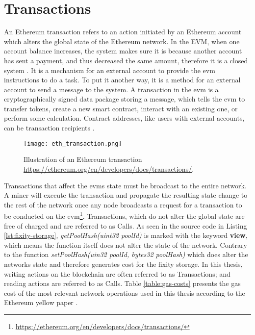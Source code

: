 \section{Transactions}\label{sec:tx-cost}
An Ethereum transaction refers to an action initiated by an Ethereum account which alters the global state of the Ethereum network. In the EVM, when one account balance increases, the system makes sure it is because another account has sent a payment, and thus decreased the same amount, therefore it is a closed system \cite[25]{dannen2017introducing}.
It is a mechanism for an external account to provide the \acrshort{evm} instructions to do a task. To put it another way, it is a method for an external account to send a message to the system. A transaction in the \acrshort{evm} is a cryptographically signed data package storing a message, which tells the \acrshort{evm} to transfer tokens, create a new smart contract, interact with an existing one, or perform some calculation. Contract addresses, like users with external accounts, can be transaction recipients \cite[60]{dannen2017introducing}. 
\begin{figure}[t]
    \centering
    \texttt{[image: eth\_transaction.png]}
    \caption{Illustration of an Ethereum transaction \url{https://ethereum.org/en/developers/docs/transactions/}.}
\end{figure}
Transactions that affect the \acrshort{evm}s state must be broadcast to the entire network. A miner will execute the transaction and propagate the resulting state change to the rest of the network once any node broadcasts a request for a transaction to be conducted on the \acrshort{evm}\footnote{\url{https://ethereum.org/en/developers/docs/transactions/}}.
Transactions, which do not alter the global state are free of charged and are referred to as Calls. As seen in the source code in Listing \ref{lst:fixity-storage}, \textit{getPoolHash(uint32 poolId)} is marked with the keyword \textbf{view}, which means the function itself does not alter the state of the network. Contrary to the function \textit{setPoolHash(uin32 poolId, bytes32 poolHash)} which does alter the networks state and therefore generates cost for the fixity storage. In this thesis, writing actions on the blockchain are often referred to as Transactions; and reading actions are referred to as Calls.
Table \ref{table:gas-costs} presents the gas cost of the most relevant network operations used in this thesis according to the Ethereum yellow paper \cite[27]{wood2014ethereum}.
